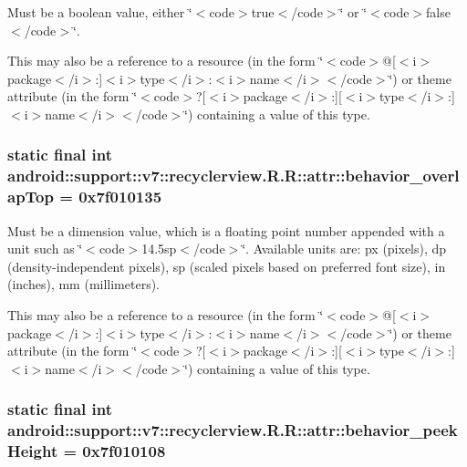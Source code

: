 Must be a boolean value, either \char`\"{}$<$code$>$true$<$/code$>$\char`\"{} or \char`\"{}$<$code$>$false$<$/code$>$\char`\"{}. 

This may also be a reference to a resource (in the form \char`\"{}$<$code$>$@\mbox{[}$<$i$>$package$<$/i$>$:\mbox{]}$<$i$>$type$<$/i$>$:$<$i$>$name$<$/i$>$$<$/code$>$\char`\"{}) or theme attribute (in the form \char`\"{}$<$code$>$?\mbox{[}$<$i$>$package$<$/i$>$:\mbox{]}\mbox{[}$<$i$>$type$<$/i$>$:\mbox{]}$<$i$>$name$<$/i$>$$<$/code$>$\char`\"{}) containing a value of this type. \hypertarget{classandroid_1_1support_1_1v7_1_1recyclerview_1_1_r_1_1attr_c15e9f2a106470cf4fda3fe16b7b9254}{
\subsubsection[{behavior\_\-overlapTop}]{\setlength{\rightskip}{0pt plus 5cm}static final int android::support::v7::recyclerview.R.R::attr::behavior\_\-overlapTop = 0x7f010135}}
\label{classandroid_1_1support_1_1v7_1_1recyclerview_1_1_r_1_1attr_c15e9f2a106470cf4fda3fe16b7b9254}


Must be a dimension value, which is a floating point number appended with a unit such as \char`\"{}$<$code$>$14.5sp$<$/code$>$\char`\"{}. Available units are: px (pixels), dp (density-independent pixels), sp (scaled pixels based on preferred font size), in (inches), mm (millimeters). 

This may also be a reference to a resource (in the form \char`\"{}$<$code$>$@\mbox{[}$<$i$>$package$<$/i$>$:\mbox{]}$<$i$>$type$<$/i$>$:$<$i$>$name$<$/i$>$$<$/code$>$\char`\"{}) or theme attribute (in the form \char`\"{}$<$code$>$?\mbox{[}$<$i$>$package$<$/i$>$:\mbox{]}\mbox{[}$<$i$>$type$<$/i$>$:\mbox{]}$<$i$>$name$<$/i$>$$<$/code$>$\char`\"{}) containing a value of this type. \hypertarget{classandroid_1_1support_1_1v7_1_1recyclerview_1_1_r_1_1attr_f775333afd6a4afad758a972cfdc82a3}{
\subsubsection[{behavior\_\-peekHeight}]{\setlength{\rightskip}{0pt plus 5cm}static final int android::support::v7::recyclerview.R.R::attr::behavior\_\-peekHeight = 0x7f010108}}
\label{classandroid_1_1support_1_1v7_1_1recyclerview_1_1_r_1_1attr_f775333afd6a4afad758a972cfdc82a3}


